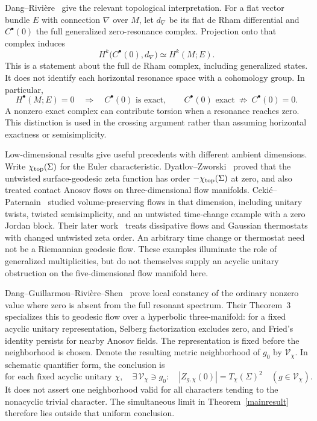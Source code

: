 \documentclass[11pt,letterpaper,reqno]{amsart}
\theoremstyle{remark}
\begin{document}
Dang--Rivi\`ere~\cite[Theorem 2.1]{DR} give the relevant topological
interpretation. For a flat vector bundle $E$ with connection $\nabla$
over $M$, let $d_\nabla$ be its flat de Rham differential and
$C^\bullet(0)$ the full generalized zero-resonance complex.
Projection onto that complex induces
\begin{equation}\label{lit:resonant-cohomology}
 H^k\bigl(C^\bullet(0),d_\nabla\bigr)
       \simeq H^k(M;E).
\end{equation}
This is a statement about the full de Rham complex, including
generalized states. It does not identify each horizontal resonance
space with a cohomology group. In particular,
\[
 H^\bullet(M;E)=0
 \quad\Longrightarrow\quad C^\bullet(0)\text{ is exact},
 \qquad
 C^\bullet(0)\text{ exact}\ \not\Longrightarrow\ C^\bullet(0)=0.
\]
A nonzero exact complex can contribute torsion when a resonance reaches
zero. This distinction is used in the crossing argument rather than
assuming horizontal exactness or semisimplicity.

Low-dimensional results give useful precedents with different ambient
dimensions. Write $\chi_{\rm top}(\Sigma)$ for the Euler characteristic.
Dyatlov--Zworski~\cite{DZ17} proved that the untwisted
surface-geodesic zeta function has order $-\chi_{\rm top}(\Sigma)$ at zero, and
also treated contact Anosov flows on three-dimensional flow manifolds.
Ceki\'c--Paternain~\cite{CP} studied volume-preserving flows in that
dimension, including unitary twists, twisted semisimplicity, and an
untwisted time-change example with a zero Jordan block. Their later
work~\cite{CP25} treats dissipative flows and Gaussian thermostats with
changed untwisted zeta order. An arbitrary time change or thermostat
need not be a Riemannian geodesic flow. These examples illuminate the
role of generalized multiplicities, but do not themselves supply an
acyclic unitary obstruction on the five-dimensional flow manifold here.

Dang--Guillarmou--Rivi\`ere--Shen~\cite{DGRS} prove local constancy of
the ordinary nonzero value where zero is absent from the full resonant
spectrum. Their Theorem~3 specializes this to geodesic flow over a
hyperbolic three-manifold: for a fixed acyclic unitary representation,
Selberg factorization excludes zero, and Fried's identity persists for
nearby Anosov fields. The representation is fixed before the
neighborhood is chosen. Denote the resulting metric neighborhood of
$g_0$ by $\mathcal V_\chi$. In schematic quantifier form, the conclusion is
\begin{equation}\label{lit:quantifiers}
 \text{for each fixed acyclic unitary }\chi,
 \quad \exists\,\mathcal V_\chi\ni g_0:
 \quad |Z_{g,\chi}(0)|=T_\chi(\Sigma)^2
       \quad(g\in\mathcal V_\chi).
\end{equation}
It does not assert one neighborhood valid for all characters tending
to the nonacyclic trivial character. The simultaneous limit in
Theorem~\ref{mainresult} therefore lies outside that uniform conclusion.
\end{document}
